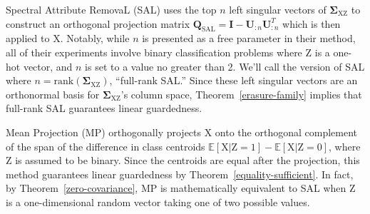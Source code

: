 \documentclass{article}
\theoremstyle{plain}
\theoremstyle{remark}
\newcommand{\sxz}{\mathbf \Sigma_{\rv X \rv Z}}
\newcommand{\E}{\mathbb E}
\theoremstyle{plain}
\theoremstyle{TheoremNum}
\newcommand{\rank}{\mathrm{rank}}
\newcommand{\rv}[1]{{\mathrm{#1}}}
\begin{document}
Spectral Attribute RemovaL (SAL) \cite{shao-etal-2023-gold} uses the top $n$ left singular vectors of $\sxz$ to construct an orthogonal projection matrix $\mathbf{Q}_{\mathrm{SAL}} = \mathbf{I} - \mathbf{U}_{:n}\mathbf{U}_{:n}^T$ which is then applied to $\rv X$. Notably, while $n$ is presented as a free parameter in their method, all of their experiments involve binary classification problems where $\rv Z$ is a one-hot vector, and $n$ is set to a value no greater than 2. We'll call the version of SAL where $n = \rank(\sxz)$, ``full-rank SAL.'' Since these left singular vectors are an orthonormal basis for $\sxz$'s column space, Theorem~\ref{erasure-family} implies that full-rank SAL guarantees linear guardedness.%

Mean Projection (MP) \cite{haghighatkhah2022better} orthogonally projects $\rv X$ onto the orthogonal complement of the span of the difference in class centroids $\E[\rv X | \rv Z = 1] - \E[\rv X | \rv Z = 0]$, where $\rv Z$ is assumed to be binary. Since the centroids are equal after the projection, this method guarantees linear guardedness by Theorem~\ref{equality-sufficient}. In fact, by Theorem~\ref{zero-covariance}, MP is mathematically equivalent to SAL when $\rv Z$ is a one-dimensional random vector taking one of two possible values.

\newpage %

\end{document}
